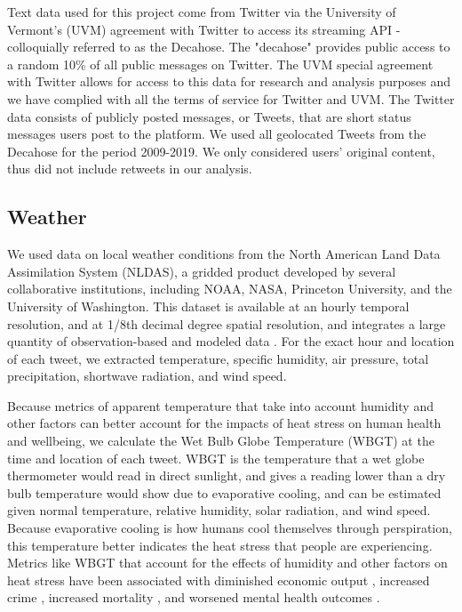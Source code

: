 \documentclass{article}
\begin{document}
Text data used for this project come from Twitter via the University of Vermont’s (UVM) agreement with Twitter to access its streaming API - colloquially referred to as the Decahose. The "decahose" provides public access to a random 10\% of all public messages on Twitter. The UVM special agreement with Twitter allows for access to this data for research and analysis purposes and we have complied with all the terms of service for Twitter and UVM. 
The Twitter data consists of publicly posted messages, or Tweets, that are short status messages users post to the platform. We used all geolocated Tweets from the Decahose for the period 2009-2019. We only considered users’ original content, thus did not include retweets in our analysis.

\subsection{Weather}
We used data on local weather conditions from the North American Land Data Assimilation System (NLDAS), a gridded product developed by several collaborative institutions, including NOAA, NASA, Princeton University, and the University of Washington.  This dataset is available at an hourly temporal resolution, and at 1/8th decimal degree spatial resolution, and integrates a large quantity of observation-based and modeled data  \cite{xia_continental-scale_2012}.  For the exact hour and location of each tweet, we extracted temperature, specific humidity, air pressure, total precipitation, shortwave radiation, and wind speed.  

Because metrics of apparent temperature that take into account humidity and other factors can better account for the impacts of heat stress on human health and wellbeing, we calculate the Wet Bulb Globe Temperature (WBGT) at the time and location of each tweet.  WBGT is the temperature that a wet globe thermometer would read in direct sunlight, and gives a reading lower than a dry bulb temperature would show due to evaporative cooling, and can be estimated given normal temperature, relative humidity, solar radiation, and wind speed.  Because evaporative cooling is how humans cool themselves through perspiration, this temperature better indicates the heat stress that people are experiencing.  Metrics like WBGT that account for the effects of humidity and other factors on heat stress have been associated with diminished economic output \cite{rao2020projections}, increased crime \cite{hu2017impact}, increased mortality \cite{chien2016spatiotemporal, armstrong2019role}, and worsened mental health outcomes \cite{vida2012relationship, ding2016importance}.
\end{document}
